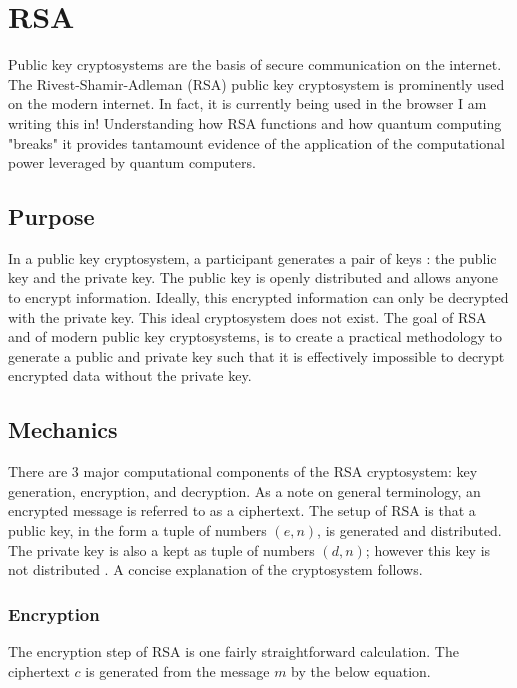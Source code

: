 \documentclass[journal]{IEEEtran}
\begin{document}
\section{RSA}

Public key cryptosystems are the basis of secure communication on the internet.
The Rivest-Shamir-Adleman (RSA) \cite{Rivest1978} public key cryptosystem is prominently used on
the modern internet. In fact, it is currently being used in the browser I am
writing this in! Understanding how RSA functions and how quantum computing
"breaks" it provides tantamount evidence of the application of the computational
power leveraged by quantum computers.

\subsection{Purpose}

In a public key cryptosystem, a participant generates a pair of keys : the
public key and the private key. The public key is openly distributed and allows
anyone to encrypt information. Ideally, this encrypted information can only be
decrypted with the private key. This ideal cryptosystem does not exist. The goal
of RSA and of modern public key cryptosystems, is to create a practical
methodology to generate a public and private key such that it is effectively
impossible to decrypt encrypted data without the private key.

\subsection{Mechanics}

There are 3 major computational components of the RSA cryptosystem: key
generation, encryption, and decryption. As a note on general terminology, an
encrypted message is referred to as a ciphertext.  The setup of RSA is that a
public key, in the form a tuple of numbers \((e, n)\), is generated and
distributed. The private key is also a kept as tuple of numbers \((d,n)\);
however this key is not distributed .  A concise explanation of the
cryptosystem follows.

\subsubsection{Encryption}

The encryption step of RSA is one fairly straightforward calculation. The
ciphertext \(c\) is generated from the message \(m\) by the below equation.
\end{document}
